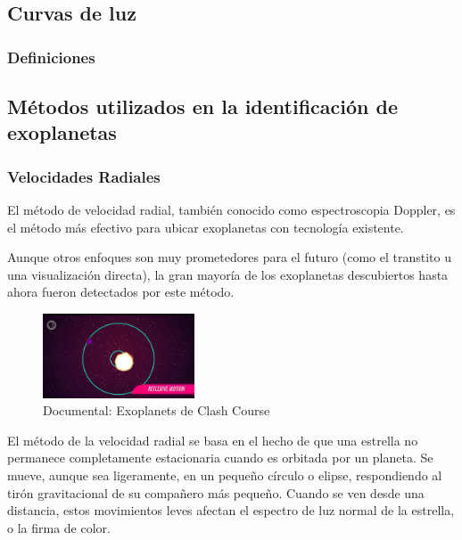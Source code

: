\documentclass[fleqn, journal]{IEEEtran}                        %
\theoremstyle{break}                                            %
\begin{document}
        \subsection{Curvas de luz}

            \subsubsection{Definiciones}

        
        \vspace{1em}
        \subsection{Métodos utilizados en la identificación de exoplanetas}
        
            \vspace{1em}
            \subsubsection{Velocidades Radiales}

                El método de velocidad radial, también conocido como espectroscopia Doppler, es el método más efectivo para ubicar
                exoplanetas con tecnología existente. 

                Aunque otros enfoques son muy prometedores para el futuro (como el transtito u una visualización directa), 
                la gran mayoría de los exoplanetas descubiertos hasta ahora fueron detectados por este método.

                \begin{figure}[h]
                    \includegraphics[width=0.40\textwidth]{Radial}
                    \caption{Documental: Exoplanets de Clash Course}
                \end{figure}

                El método de la velocidad radial se basa en el hecho de que una estrella no permanece completamente estacionaria
                cuando es orbitada por un planeta. Se mueve, aunque sea ligeramente, en un pequeño círculo o elipse,
                respondiendo al tirón gravitacional de su compañero más pequeño. Cuando se ven desde una distancia,
                estos movimientos leves afectan el espectro de luz normal de la estrella, o la firma de color.
                
\end{document}
